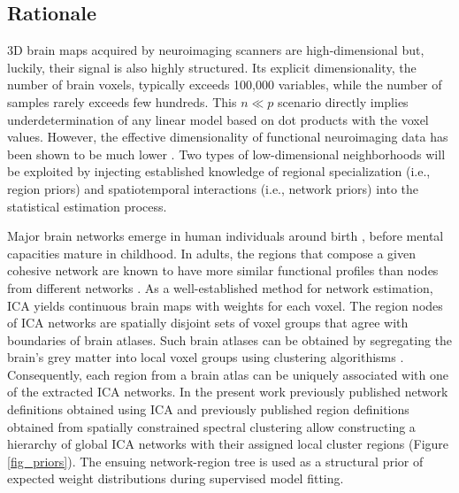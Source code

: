 \documentclass{article}
\begin{document}
\subsection{Rationale}
3D brain maps acquired by neuroimaging
scanners are high-dimensional but, luckily,
their signal is also highly structured.
Its explicit dimensionality, the number of brain voxels,
typically exceeds 100,000 variables, while the number
of samples rarely exceeds few hundreds.
This $n \ll p$ scenario directly implies underdetermination of any
linear model based on dot products with the voxel values.
However, the effective dimensionality of functional neuroimaging data has been
shown to be much lower \cite{bzdok2015semi}.
Two types of low-dimensional neighborhoods will be exploited by
injecting established knowledge of regional specialization
(i.e., region priors)
and spatiotemporal interactions
(i.e., network priors)
into the statistical estimation process.



Major brain networks emerge in human individuals around birth
\cite{doria2010}, before mental capacities mature in childhood. 
In adults,
the regions that compose
a given cohesive network are known to have more
similar functional profiles than nodes from different networks
\cite{anderson2013}.
As a well-established method for network estimation,
ICA \cite{beckmann2005} yields continuous brain maps with
weights for each voxel. The region nodes of ICA
networks are spatially disjoint sets of voxel groups that
agree with boundaries of brain atlases.
Such brain atlases can be obtained by segregating
the brain's grey matter into local voxel groups
using clustering algorithisms
\cite{cbp2015review}.
Consequently,
each region from a brain atlas can be uniquely associated with one of
the extracted ICA networks.
%
In the present work previously published network definitions
obtained using ICA \cite{smith2009}
and
previously published region definitions obtained from
spatially constrained spectral clustering \cite{crad12}
allow constructing a hierarchy of global ICA networks with their
assigned local cluster regions
(Figure \ref{fig_priors}).
The ensuing network-region tree is used as a structural prior
of expected weight distributions
during supervised model fitting.
\end{document}
